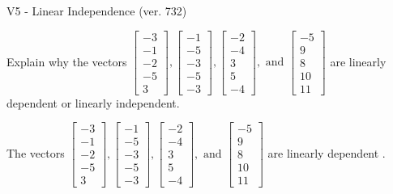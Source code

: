 \begin{exercise}
  \begin{exerciseTitle}V5 - Linear Independence (ver. 732)\end{exerciseTitle}
  \begin{exerciseStatement}
    Explain why the vectors \(\left[\begin{array}{r}
-3 \\
-1 \\
-2 \\
-5 \\
3
\end{array}\right] , \left[\begin{array}{r}
-1 \\
-5 \\
-3 \\
-5 \\
-3
\end{array}\right] , \left[\begin{array}{r}
-2 \\
-4 \\
3 \\
5 \\
-4
\end{array}\right] , \text{ and } \left[\begin{array}{r}
-5 \\
9 \\
8 \\
10 \\
11
\end{array}\right]\) are linearly dependent or linearly independent.	


  \end{exerciseStatement}
  \begin{exerciseAnswer}
   The vectors \(\left[\begin{array}{r}
-3 \\
-1 \\
-2 \\
-5 \\
3
\end{array}\right] , \left[\begin{array}{r}
-1 \\
-5 \\
-3 \\
-5 \\
-3
\end{array}\right] , \left[\begin{array}{r}
-2 \\
-4 \\
3 \\
5 \\
-4
\end{array}\right] , \text{ and } \left[\begin{array}{r}
-5 \\
9 \\
8 \\
10 \\
11
\end{array}\right]\) are 
  	 linearly dependent  .
  


  \end{exerciseAnswer}
\end{exercise}